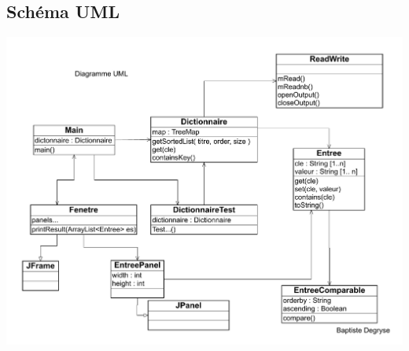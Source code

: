 \documentclass[a4paper]{article}
\begin{document}
\subsection*{Schéma UML}
\includegraphics[scale=0.5]{DiagrammeUML.pdf}
\end{document}
